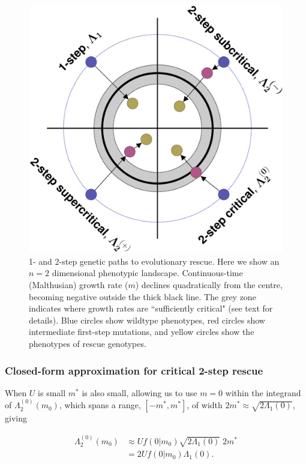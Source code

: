 \documentclass[9pt,twocolumn,twoside,lineno]{gsajnl}
\begin{document}
\begin{figure}[htb]
\centering
\includegraphics[width=\linewidth]{Figure4.eps}
\caption{
1- and 2-step genetic paths to evolutionary rescue.
Here we show an $n=2$ dimensional phenotypic landscape.
Continuous-time (Malthusian) growth rate ($m$) declines quadratically from the centre, becoming negative outside the thick black line.
The grey zone indicates where growth rates are ``sufficiently critical" (see text for details).
Blue circles show wildtype phenotypes, red circles show intermediate first-step mutations, and yellow circles show the phenotypes of rescue genotypes.
}%
\label{fig:paths}
\end{figure}

\subsubsection{Closed-form approximation for critical 2-step rescue}

When $U$ is small $m^*$ is also small, allowing us to use $m = 0$ within the integrand of $\Lambda_2^{(0)}(m_0)$, which spans a range, $[-m^*,m^*]$, of width $2m^* \approx  \sqrt{2\Lambda_1(0)}$, giving 

\begin{equation}\label{eq:p20app1}
\begin{aligned}
\Lambda_2^{(0)}(m_0)
&\approx U f(0|m_0)  \sqrt{2\Lambda_1(0)} \; 2m^*\\
&= 2 U f(0|m_0) \Lambda_1(0).
\end{aligned}
\end{equation}
\end{document}
